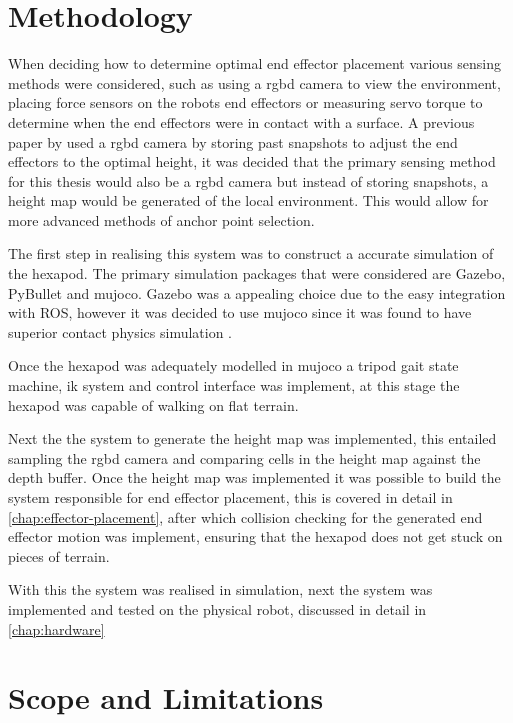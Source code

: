 \section{Methodology}
    When deciding how to determine optimal end effector placement various sensing methods were considered, such as using a \ac{rgbd} camera to view the environment,
    placing force sensors on the robots end effectors or measuring servo torque to determine when the end effectors were in contact with a surface. A previous paper by \cite{erasmus2023guidance} used a \ac{rgbd} camera
    by storing past snapshots to adjust the end effectors to the optimal height, it was decided that the primary sensing method for this thesis would also be a \ac{rgbd} camera
    but instead of storing snapshots, a height map would be generated of the local environment. This would allow for more advanced methods of anchor point selection.

    The first step in realising this system was to construct a accurate simulation of the hexapod. The primary simulation packages that were considered are Gazebo, PyBullet and \ac{mujoco}.
    Gazebo was a appealing choice due to the easy integration with ROS, however it was decided to use \ac{mujoco} since it was found to have superior contact physics simulation \citep{Erez-2015}.

    Once the hexapod was adequately modelled in \ac{mujoco} a tripod gait state machine, \ac{ik} system and control interface was implement, at this stage the hexapod was capable of walking
    on flat terrain.

    Next the the system to generate the height map was implemented, this entailed sampling the \ac{rgbd} camera and comparing cells in the height map against the depth buffer.
    Once the height map was implemented it was possible to build the system responsible for end effector placement, this is covered in detail in \autoref{chap:effector-placement},
    after which collision checking for the generated end effector motion was implement, ensuring that the hexapod does not get stuck on pieces of terrain.

    With this the system was realised in simulation, next the system was implemented and tested on the physical robot, discussed in detail in \autoref{chap:hardware}

\newpage
\section{Scope and Limitations}

